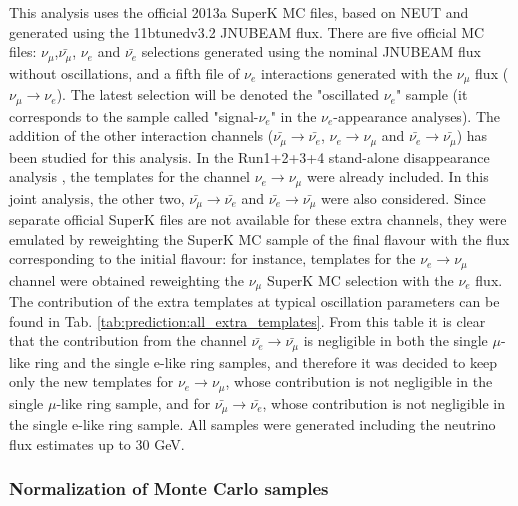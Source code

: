 This analysis uses the official 2013a SuperK MC files, based on NEUT and generated using the 11btunedv3.2 JNUBEAM flux.
There are five official MC files: $\nu_{\mu}$,$\bar{\nu_{\mu}}$, $\nu_{e}$ and $\bar{\nu_{e}}$ selections generated using
the nominal JNUBEAM flux without oscillations, and a fifth file of $\nu_{e}$ interactions generated with the $\nu_{\mu}$ flux 
($\nu_{\mu}\rightarrow\nu_{e}$). The latest selection will be denoted the "oscillated $\nu_{e}$" sample (it corresponds to the sample called "signal-$\nu_{e}$" 
in the $\nu_{e}$-appearance analyses). The addition of the other interaction channels ($\bar{\nu_{\mu}}\rightarrow\bar{\nu_{e}}$, $\nu_{e}\rightarrow\nu_{\mu}$ and $\bar{\nu_{e}}\rightarrow\bar{\nu_{\mu}}$) has been studied for this analysis. 
In the Run1+2+3+4 stand-alone disappearance analysis \cite{OurRun1234DisappAnalysis3Flavour}, the templates for the channel  
$\nu_{e}\rightarrow\nu_{\mu}$ were already included. In this joint analysis, the other two, $\bar{\nu_{\mu}}\rightarrow\bar{\nu_{e}}$ and 
$\bar{\nu_{e}}\rightarrow\bar{\nu_{\mu}}$ were also considered. Since separate official SuperK files are not available for these extra 
channels, they were emulated by reweighting the SuperK MC sample of the final flavour with the flux corresponding to the initial flavour:
for instance, templates for the $\nu_{e}\rightarrow\nu_{\mu}$ channel were obtained reweighting the $\nu_{\mu}$ SuperK MC selection
with the $\nu_{e}$ flux. The contribution of the extra templates at typical oscillation parameters can be found in Tab. \ref{tab:prediction:all_extra_templates}. 
From this table it is clear that the contribution from the channel  $\bar{\nu_{e}}\rightarrow\bar{\nu_{\mu}}$ is negligible in both
the single $\mu$-like ring and the single e-like ring samples, and therefore it was decided to keep only the new templates for
$\nu_{e}\rightarrow\nu_{\mu}$, whose contribution is not negligible in the single $\mu$-like ring sample, and for 
$\bar{\nu_{\mu}}\rightarrow\bar{\nu_{e}}$, whose contribution is not negligible in the single e-like ring sample.
All samples were generated including the neutrino flux estimates up to 30 GeV. 


\subsubsection{Normalization of Monte Carlo samples}
\label{sec:prediction:nominal:normalization}

